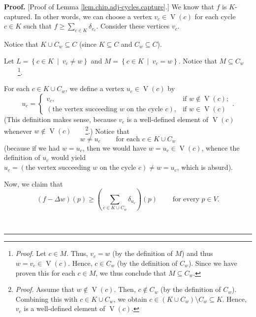 \documentclass[numbers=enddot,12pt,final,onecolumn,notitlepage]{scrartcl}%
\theoremstyle{definition}
\newenvironment{proof}[1][Proof]{\noindent\textbf{#1.} }{\ \rule{0.5em}{0.5em}}
\let\sumnonlimits\sum
\renewcommand{\sum}{\sumnonlimits\limits}
\newenvironment{noncompile}{}{}
\begin{document}
\begin{proof}
[Proof of Lemma \ref{lem.chip.adj-cycles.capture}.] We know that $f$ is
$K$-captured. In other words, we can choose a vertex $v_{c}\in
\operatorname*{V}\left(  c\right)  $ for each cycle $c\in K$ such that
$f\geq\sum_{c\in K}\delta_{v_{c}}$. Consider these vertices $v_{c}$.

Notice that $K\cup C_{w}\subseteq C$ (since $K\subseteq C$ and $C_{w}\subseteq
C$).

\begin{noncompile}
Let $L=\left\{  c\in K\ \mid\ v_{c}\neq w\right\}  $ and $M=\left\{  c\in
K\ \mid\ v_{c}=w\right\}  $. Notice that $M\subseteq C_{w}$%
\ \ \ \ \footnote{\textit{Proof.} Let $c\in M$. Thus, $v_{c}=w$ (by the
definition of $M$) and thus $w=v_{c}\in\operatorname*{V}\left(  c\right)  $.
Hence, $c\in C_{w}$ (by the definition of $C_{w}$). Since we have proven this
for each $c\in M$, we thus conclude that $M\subseteq C_{w}$.}.
\end{noncompile}

For each $c\in K\cup C_{w}$, we define a vertex $u_{c}\in\operatorname*{V}%
\left(  c\right)  $ by%
\[
u_{c}=%
\begin{cases}
v_{c}, & \text{if }w\notin\operatorname*{V}\left(  c\right)  ;\\
\left(  \text{the vertex succeeding }w\text{ on the cycle }c\right)  , &
\text{if }w\in\operatorname*{V}\left(  c\right)
\end{cases}
.
\]
(This definition makes sense, because $v_{c}$ is a well-defined element of
$\operatorname*{V}\left(  c\right)  $ whenever $w\notin\operatorname*{V}%
\left(  c\right)  $\ \ \ \ \footnote{\textit{Proof.} Assume that
$w\notin\operatorname*{V}\left(  c\right)  $. Then, $c\notin C_{w}$ (by the
definition of $C_{w}$). Combining this with $c\in K\cup C_{w}$, we obtain
$c\in\left(  K\cup C_{w}\right)  \setminus C_{w}\subseteq K$. Hence, $v_{c}$
is a well-defined element of $\operatorname*{V}\left(  c\right)  $.}.) Notice
that%
\begin{equation}
w\neq u_{c}\ \ \ \ \ \ \ \ \ \ \text{for each }c\in K\cup C_{w}%
\label{pf.lem.chip.adj-cycles.capture.ucneq}%
\end{equation}
(because if we had $w=u_{c}$, then we would have $w=u_{c}\in\operatorname*{V}%
\left(  c\right)  $, whence the definition of $u_{c}$ would yield
$u_{c}=\left(  \text{the vertex succeeding }w\text{ on the cycle }c\right)
\neq w=u_{c}$, which is absurd).

Now, we claim that%
\begin{equation}
\left(  f-\Delta w\right)  \left(  p\right)  \geq\left(  \sum_{c\in K\cup
C_{w}}\delta_{u_{c}}\right)  \left(  p\right)  \ \ \ \ \ \ \ \ \ \ \text{for
every }p\in V.\label{pf.lem.chip.adj-cycles.capture.ineq}%
\end{equation}



\end{proof}
\end{document}
